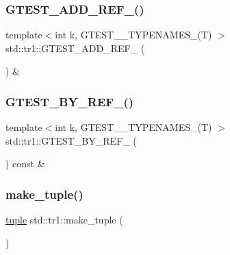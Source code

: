 \subsubsection{\texorpdfstring{G\+T\+E\+S\+T\+\_\+\+A\+D\+D\+\_\+\+R\+E\+F\+\_\+()}{GTEST\_ADD\_REF\_()}}
{\footnotesize\ttfamily template$<$int k, G\+T\+E\+S\+T\+\_\+\_\+\+T\+Y\+P\+E\+N\+A\+M\+E\+S\+\_\+(\+T) $>$ \\
std\+::tr1\+::\+G\+T\+E\+S\+T\+\_\+\+A\+D\+D\+\_\+\+R\+E\+F\+\_\+ (\begin{DoxyParamCaption}\item[{\hyperlink{gtest-tuple_8h_a1b7f133d8aa02e0b7afed7b66781eeb7}{G\+T\+E\+S\+T\+\_\+\+T\+U\+P\+L\+E\+\_\+\+E\+L\+E\+M\+E\+N\+T\+\_\+}(k, \hyperlink{namespacestd_1_1tr1_aa636d3269bf1f368a7bc09ff158bc482}{G\+T\+E\+S\+T\+\_\+10\+\_\+\+T\+U\+P\+L\+E\+\_\+}(T))}]{ }\end{DoxyParamCaption}) \&}

\mbox{\label{namespacestd_1_1tr1_ae7b5ea477ac34a3eef5c4c15c42b76ed}} 
\subsubsection{\texorpdfstring{G\+T\+E\+S\+T\+\_\+\+B\+Y\+\_\+\+R\+E\+F\+\_\+()}{GTEST\_BY\_REF\_()}}
{\footnotesize\ttfamily template$<$int k, G\+T\+E\+S\+T\+\_\+\_\+\+T\+Y\+P\+E\+N\+A\+M\+E\+S\+\_\+(\+T) $>$ \\
std\+::tr1\+::\+G\+T\+E\+S\+T\+\_\+\+B\+Y\+\_\+\+R\+E\+F\+\_\+ (\begin{DoxyParamCaption}\item[{\hyperlink{gtest-tuple_8h_a1b7f133d8aa02e0b7afed7b66781eeb7}{G\+T\+E\+S\+T\+\_\+\+T\+U\+P\+L\+E\+\_\+\+E\+L\+E\+M\+E\+N\+T\+\_\+}(k, \hyperlink{namespacestd_1_1tr1_aa636d3269bf1f368a7bc09ff158bc482}{G\+T\+E\+S\+T\+\_\+10\+\_\+\+T\+U\+P\+L\+E\+\_\+}(T))}]{ }\end{DoxyParamCaption}) const \&}

\mbox{\label{namespacestd_1_1tr1_af7e12a0f5b5791b5b7c49a5a17b85359}} 
\subsubsection{\texorpdfstring{make\+\_\+tuple()}{make\_tuple()}}
{\footnotesize\ttfamily \hyperlink{classstd_1_1tr1_1_1tuple}{tuple} std\+::tr1\+::make\+\_\+tuple (\begin{DoxyParamCaption}{ }\end{DoxyParamCaption})\hspace{0.3cm}{\ttfamily [inline]}}

